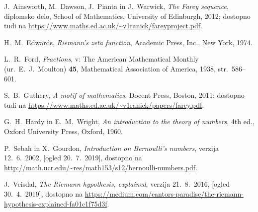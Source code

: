 \documentclass[mat1]{fmfdelo}
\begin{document}
\begin{thebibliography}{99}

 J.~Ainsworth, M.~Dawson, J.~Pianta in J.~Warwick, \emph{The Farey sequence}, diplomsko delo, School of Mathematics, University of Edinburgh, 2012; dostopno tudi na \url{https://www.maths.ed.ac.uk/~v1ranick/fareyproject.pdf}.

 H.~M.~Edwards, \emph{Riemann's zeta function}, Academic Press, Inc., New York, 1974.

 L.~R.~Ford, \emph{Fractions}, v: The American Mathematical Monthly (ur.\ E.~J.~Moulton) \textbf{45}, Mathematical Association of America, 1938, str.\ 586--601.

 S.~B.~Guthery, \emph{A motif of mathematics}, Docent Press, Boston, 2011; dostopno tudi na \url{https://www.maths.ed.ac.uk/~v1ranick/papers/farey.pdf}.

 G.~H.~Hardy in E.~M.~Wright, \emph{An introduction to the theory of numbers}, 4th ed., Oxford University Press, Oxford, 1960.

 P.~Sebah in X.~Gourdon, \emph{Introduction on Bernoulli's numbers}, verzija 12.~6.~2002, [ogled 20.~7.~2019], dostopno na \url{http://math.ucr.edu/~res/math153/s12/bernoulli-numbers.pdf}.

 J.~Veisdal, \emph{The Riemann hypothesis, explained}, verzija 21.~8.~2016, [ogled 30.~4.~2019], dostopno na \url{https://medium.com/cantors-paradise/the-riemann-hypothesis-explained-fa01c1f75d3f}.

\end{thebibliography}
\end{document}
